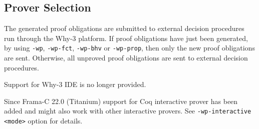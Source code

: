 \subsection{Prover Selection}
\label{wp-provers}

The generated proof obligations are submitted to external decision
procedures run through the \textsf{Why-3} platform.  If proof obligations have
just been generated, by using \texttt{-wp}, \texttt{-wp-fct}, \texttt{-wp-bhv}
or \texttt{-wp-prop}, then only the new proof obligations are sent. Otherwise,
all unproved proof obligations are sent to external decision procedures.

Support for \textsf{Why-3 IDE} is no longer provided.

Since \textsf{Frama-C 22.0} (Titanium) support for Coq interactive prover has
been added and might also work with other interactive provers.
See \texttt{-wp-interactive <mode>} option for details.

